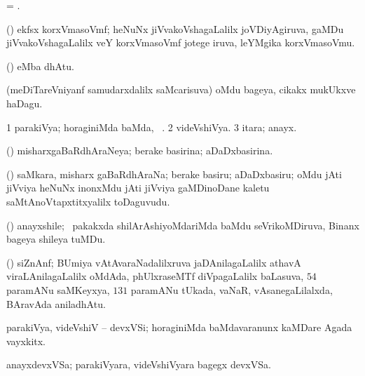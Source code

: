 \bentry
{} 
\gl{\nA}
\bmng
= .
\emng
\eentry


\bentry
{} 
\gl{\nA} 
\bmng
(\jiVvi) ekfsx korxVmasoVmf; heNuNx jiVvakoVshagaLalilx joVDiyAgiruva, gaMDu jiVvakoVshagaLalilx veY  korxVmasoVmf jotege iruva, leYMgika korxVmasoVmu.
\emng  
\eentry

\bentry
{} 
\gl{\saMkiSx}
\bmng
{}
\emng
\eentry

\bentry
{}
\gl{\saMkeV}
\bmng
(\ravi)  eMba dhAtu.
\emng
\eentry

\bentry
{} 
\gl{\nA} 
\bmng
(meDiTareVniyanf samudarxdalilx saMcarisuva) oMdu bageya, cikakx mukUkxve haDagu. \quad {}
\emng
\eentry

\bentry
{} 
\gl{\sapUpa} 
\bmng
\bnum
\num{1} parakiVya; horaginiMda baMda, \udA\ .  
\num{2} videVshiVya. 
\num{3} itara; anayx.
\enum
\emng
\eentry

\bentry
{} 
\gl{\gu} 
\bmng
(\jiVvi) misharxgaBaRdhAraNeya; berake basirina; aDaDxbasirina.
\emng
\eentry

\bentry
{} 
\gl{\nA} 
\bmng
(\jiVvi) saMkara, misharx gaBaRdhAraNa; berake basiru; aDaDxbasiru; oMdu jAti jiVviya heNuNx inonxMdu jAti jiVviya gaMDinoDane kaletu saMtAnoVtapxtitxyalilx toDaguvudu.
\emng
\eentry

\bentry
{} 
\gl{\nA} 
\bmng
(\BUvi) anayxshile; \sA\ pakakxda shilArAshiyoMdariMda baMdu  seVrikoMDiruva, Binanx bageya shileya tuMDu.
\emng 
\eentry

\bentry
{} 
\gl{\nA}
\bmng
(\ravi) siZnAnf; BUmiya vAtAvaraNadalilxruva  jaDAnilagaLalilx athavA viraLAnilagaLalilx oMdAda, phUlxraseMTf  diVpagaLalilx baLasuva, $54$ paramANu  saMKeyxya, $131$ paramANu tUkada, vaNaR, vAsanegaLilalxda, BAravAda  aniladhAtu.
\emng  
\eentry

\bentry
{} 
\gl{\nA} 
\bmng
parakiVya, videVshiV -- devxVSi; horaginiMda  baMdavaranunx kaMDare Agada vayxkitx.
\emng  
\eentry

\bentry
{} 
\gl{\nA}
\bmng
anayxdevxVSa; parakiVyara, videVshiVyara bagegx devxVSa.
\emng
\eentry

